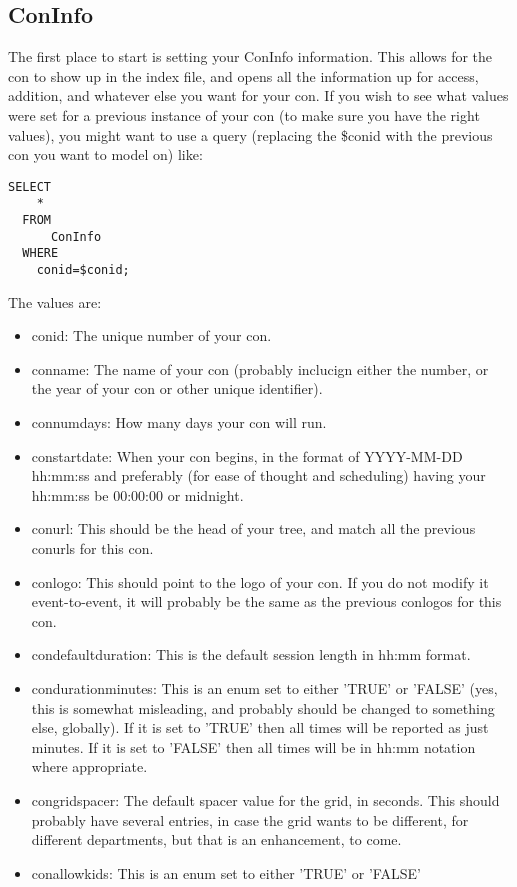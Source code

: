 \documentclass[captions=tablesignature]{scrartcl}
\begin{document}
\subsection{ConInfo}
\label{sec-11-1}
The first place to start is setting your ConInfo information.  This
allows for the con to show up in the index file, and opens all the
information up for access, addition, and whatever else you want for
your con.  If you wish to see what values were set for a previous
instance of your con (to make sure you have the right values), you
might want to use a query (replacing the \$conid with the previous
con you want to model on) like:
\begin{verbatim}
SELECT
    *
  FROM
      ConInfo
  WHERE
    conid=$conid;
\end{verbatim}
The values are:
\begin{itemize}
\item conid: The unique number of your con.
\item conname: The name of your con (probably inclucign either the
number, or the year of your con or other unique identifier).
\item connumdays: How many days your con will run.
\item constartdate: When your con begins, in the format of YYYY-MM-DD
hh:mm:ss and preferably (for ease of thought and scheduling)
having your hh:mm:ss be 00:00:00 or midnight.
\item conurl: This should be the head of your tree, and match all the
previous conurls for this con.
\item conlogo: This should point to the logo of your con.  If you do
not modify it event-to-event, it will probably be the same as the
previous conlogos for this con.
\item condefaultduration: This is the default session length in hh:mm
format.
\item condurationminutes: This is an enum set to either 'TRUE' or
'FALSE' (yes, this is somewhat misleading, and probably should be
changed to something else, globally).  If it is set to 'TRUE'
then all times will be reported as just minutes.  If it is set to
'FALSE' then all times will be in hh:mm notation where
appropriate.
\item congridspacer: The default spacer value for the grid, in seconds.
This should probably have several entries, in case the grid wants
to be different, for different departments, but that is an
enhancement, to come.
\item conallowkids: This is an enum set to either 'TRUE' or 'FALSE'

\end{itemize}
\end{document}
